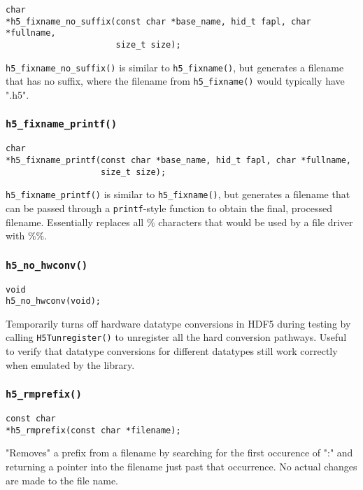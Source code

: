 \documentclass[../HDF5_RFC.tex]{subfiles}
\begin{document}
\begin{verbatim}
char
*h5_fixname_no_suffix(const char *base_name, hid_t fapl, char *fullname,
                      size_t size);
\end{verbatim}

\texttt{h5\_fixname\_no\_suffix()} is similar to \texttt{h5\_fixname()}, but generates a filename that
has no suffix, where the filename from \texttt{h5\_fixname()} would typically have ".h5".

\subsubsection{\texttt{h5\_fixname\_printf()}}

\begin{verbatim}
char
*h5_fixname_printf(const char *base_name, hid_t fapl, char *fullname,
                   size_t size);
\end{verbatim}

\texttt{h5\_fixname\_printf()} is similar to \texttt{h5\_fixname()}, but generates a filename that can
be passed through a \texttt{printf}-style function to obtain the final, processed filename. Essentially
replaces all \% characters that would be used by a file driver with \%\%.

\subsubsection{\texttt{h5\_no\_hwconv()}}

\begin{verbatim}
void
h5_no_hwconv(void);
\end{verbatim}

Temporarily turns off hardware datatype conversions in HDF5 during testing by calling
\texttt{H5Tunregister()} to unregister all the hard conversion pathways. Useful to verify that
datatype conversions for different datatypes still work correctly when emulated by the library.

\subsubsection{\texttt{h5\_rmprefix()}}

\begin{verbatim}
const char
*h5_rmprefix(const char *filename);
\end{verbatim}

"Removes" a prefix from a filename by searching for the first occurence of ":" and returning
a pointer into the filename just past that occurrence. No actual changes are made to the file
name.
\end{document}
